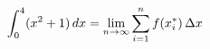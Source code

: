 \documentclass[preview]{standalone}
\begin{document}
\begin{align*}
\special{dvisvgm:raw <g id='unique000'>}\int_{0}^{4} (x^2 + 1)\,dx = \lim_{n \to \infty} \sum_{i=1}^{n} f(x_i^*)\,\Delta x\special{dvisvgm:raw </g>}
\end{align*}
\end{document}
